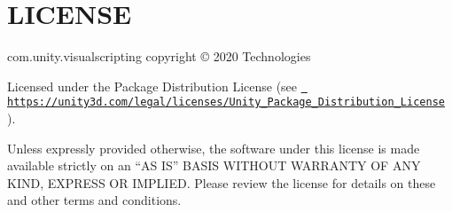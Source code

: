 \chapter{LICENSE}
\hypertarget{md__hey_tea_9_2_library_2_package_cache_2com_8unity_8visualscripting_0d1_88_80_2_l_i_c_e_n_s_e}{}\label{md__hey_tea_9_2_library_2_package_cache_2com_8unity_8visualscripting_0d1_88_80_2_l_i_c_e_n_s_e}
com.\+unity.\+visualscripting copyright © 2020  Technologies

Licensed under the  Package Distribution License (see \href{https://unity3d.com/legal/licenses/Unity_Package_Distribution_License}{\texttt{ https\+://unity3d.\+com/legal/licenses/\+Unity\+\_\+\+Package\+\_\+\+Distribution\+\_\+\+License}} ).

Unless expressly provided otherwise, the software under this license is made available strictly on an “\+AS IS” BASIS WITHOUT WARRANTY OF ANY KIND, EXPRESS OR IMPLIED. Please review the license for details on these and other terms and conditions. 